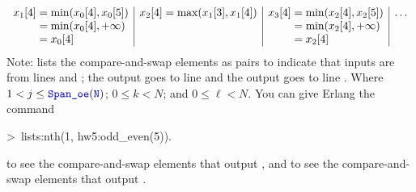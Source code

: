 \documentclass{article}
\newcommand{\erlprompt}{>~}
\begin{document}
\begin{enumerate}
\begin{displaymath}
\begin{array}{l|l|l|l}
                  \xji{1}{4} = \min(\xji{0}{4}, \xji{0}{5})
                                                            & \xji{2}{4} = \max(\xji{1}{3}, \xji{1}{4})
                                                            & \xji{3}{4} = \min(\xji{2}{4}, \xji{2}{5})        & \ldots                                                    \\
                  \phantom{\xji{1}{4}} = \min(\xji{0}{4}, +\infty)
                                                            &                                                  & \phantom{\xji{3}{4}} = \min(\xji{2}{4}, +\infty) &        \\
                  \phantom{\xji{1}{4}} = \xji{0}{4}
                                                            &                                                  & \phantom{\xji{3}{4}} = \xji{2}{4}                &
              \end{array}\end{displaymath}
          Note:  lists the compare-and-swap elements as
           pairs to indicate that inputs are from lines  and \code{$\ell$};
          the  output goes to line  and the  output goes to line \code{$\ell$}.
          Where $1 < j \leq \spoe$; $0 \leq k < N$; and $0 \leq \ell < N$.
          You can give Erlang the command
          \begin{xcode}
              \erlprompt lists:nth(1, hw5:odd\_even(5)).\\
          \end{xcode}
          to see the compare-and-swap elements that output , and
           to see the compare-and-swap elements that output .


\end{enumerate}
\end{document}
